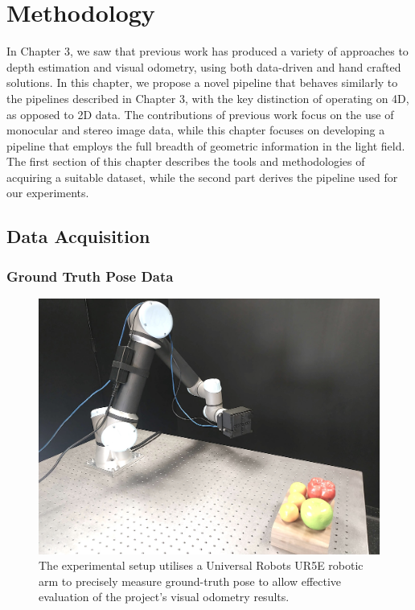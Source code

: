 \chapter{Methodology}

In Chapter 3, we saw that previous work has produced a variety of approaches to depth estimation and visual odometry, using both data-driven and hand crafted solutions. In this chapter, we propose a novel pipeline that behaves similarly to the pipelines described in Chapter 3, with the key distinction of operating on 4D, as opposed to 2D data. The contributions of previous work focus on the use of monocular and stereo image data, while this chapter focuses on developing a pipeline that employs the full breadth of geometric information in the light field. The first section of this chapter describes the tools and methodologies of acquiring a suitable dataset, while the second part derives the pipeline used for our experiments.

\section{Data Acquisition}

\subsection{Ground Truth Pose Data}

\begin{figure}[h]
    \centering 
    \includegraphics[width=\textwidth]{images/experimentalsetup2.jpg}
    \caption[Experimental setup with UR5E manipulator and EpiImaging camera module]{The experimental setup utilises a Universal Robots UR5E robotic arm to precisely measure ground-truth pose to allow effective evaluation of the project's visual odometry results.}
\end{figure}

